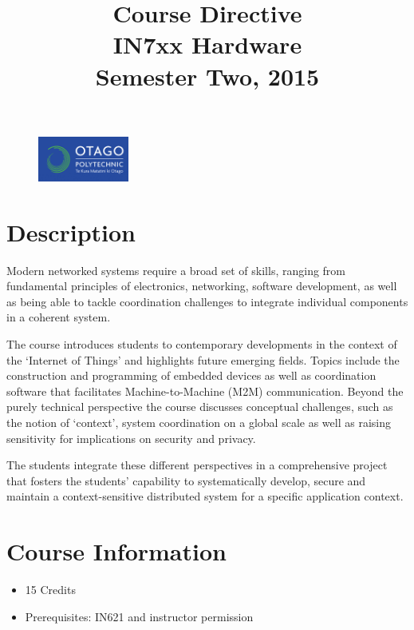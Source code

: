 \documentclass{article}
\begin{document}
\begin{figure}
\includegraphics[width=30mm]{../../../resources/images/oplogo.png}
\end{figure}

\title{Course Directive\\IN7xx Hardware\\Semester Two, 2015}
\date{}
\maketitle

\section*{Description}
Modern networked systems require a broad set of skills, ranging from fundamental principles of electronics, networking, software development, as well as being able to tackle coordination challenges to integrate individual components in a coherent system. 

The course introduces students to contemporary developments in the context of the `Internet of Things' and highlights future emerging fields. Topics include the construction and programming of embedded devices as well as coordination software that facilitates Machine-to-Machine (M2M) communication. Beyond the purely technical perspective the course discusses conceptual challenges, such as the notion of `context', system coordination on a global scale as well as raising sensitivity for implications on security and privacy. 

The students integrate these different perspectives in a comprehensive project that fosters the students' capability to systematically develop, secure and maintain a context-sensitive distributed system for a specific application context. 


\section*{Course Information}
\begin{itemize}
  \item 15 Credits
  \item Prerequisites: IN621 and instructor permission
\end{itemize}
\end{document}
